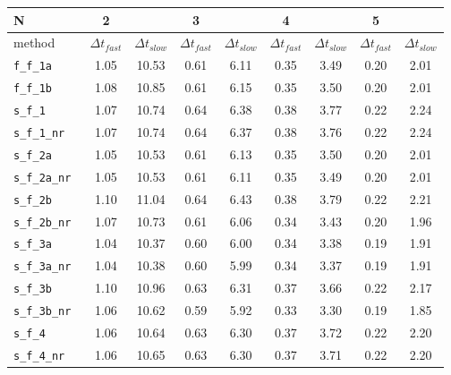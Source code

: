 \begin{tabular}{l|cc|cc|cc|cc}
N& 2  &  & 3  &  & 4  &  & 5  &  \\
\hline
method& $\Delta t_{fast}$  & $\Delta t_{slow}$& $\Delta t_{fast}$  & $\Delta t_{slow}$& $\Delta t_{fast}$  & $\Delta t_{slow}$& $\Delta t_{fast}$  & $\Delta t_{slow}$\\
\hline
\verb|f_f_1a | & 1.05 & 10.53 & 0.61 & 6.11 & 0.35 & 3.49 & 0.20 & 2.01 \\
\verb|f_f_1b | & 1.08 & 10.85 & 0.61 & 6.15 & 0.35 & 3.50 & 0.20 & 2.01 \\
\verb|s_f_1 | & 1.07 & 10.74 & 0.64 & 6.38 & 0.38 & 3.77 & 0.22 & 2.24 \\
\verb|s_f_1_nr | & 1.07 & 10.74 & 0.64 & 6.37 & 0.38 & 3.76 & 0.22 & 2.24 \\
\verb|s_f_2a | & 1.05 & 10.53 & 0.61 & 6.13 & 0.35 & 3.50 & 0.20 & 2.01 \\
\verb|s_f_2a_nr | & 1.05 & 10.53 & 0.61 & 6.11 & 0.35 & 3.49 & 0.20 & 2.01 \\
\verb|s_f_2b | & 1.10 & 11.04 & 0.64 & 6.43 & 0.38 & 3.79 & 0.22 & 2.21 \\
\verb|s_f_2b_nr | & 1.07 & 10.73 & 0.61 & 6.06 & 0.34 & 3.43 & 0.20 & 1.96 \\
\verb|s_f_3a | & 1.04 & 10.37 & 0.60 & 6.00 & 0.34 & 3.38 & 0.19 & 1.91 \\
\verb|s_f_3a_nr | & 1.04 & 10.38 & 0.60 & 5.99 & 0.34 & 3.37 & 0.19 & 1.91 \\
\verb|s_f_3b | & 1.10 & 10.96 & 0.63 & 6.31 & 0.37 & 3.66 & 0.22 & 2.17 \\
\verb|s_f_3b_nr | & 1.06 & 10.62 & 0.59 & 5.92 & 0.33 & 3.30 & 0.19 & 1.85 \\
\verb|s_f_4 | & 1.06 & 10.64 & 0.63 & 6.30 & 0.37 & 3.72 & 0.22 & 2.20 \\
\verb|s_f_4_nr | & 1.06 & 10.65 & 0.63 & 6.30 & 0.37 & 3.71 & 0.22 & 2.20 \\
\hline
\end{tabular}
